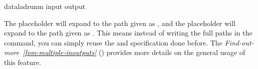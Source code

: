 %
\begin{sphinxVerbatim}[commandchars=\\\{\}]
dataladrun\PYGZhy{}m
\PYGZhy{}\PYGZhy{}input
\PYGZhy{}\PYGZhy{}output
\end{sphinxVerbatim}
\sphinxresetverbatimhllines

\sphinxAtStartPar
The placeholder  will expand to the path given as , and
the placeholder  will expand to the path given as .
This means instead of writing the full paths in the command, you can simply reuse
the  and  specification done before.
The \textit{Find-out-more}~{\findoutmoreiconinline}\textit{\ref{fom-multiple-inoutputs}} {\hyperref[\detokenize{basics/101-110-run2:fom-multiple-inoutputs}]{}} () provides more details on the general usage of this feature.

